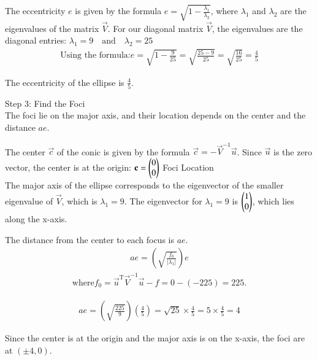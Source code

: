 \documentclass[journal]{IEEEtran}
\begin{document}
The eccentricity $e$ is given by the formula $e = \sqrt{1 - \frac{\lambda_1}{\lambda_2}}$, where $\lambda_1$ and $\lambda_2$ are the eigenvalues of the matrix $\vec{V}$. For our diagonal matrix $\vec{V}$, the eigenvalues are the diagonal entries:
$
\lambda_1 = 9 \quad \text{and} \quad \lambda_2 = 25
$\\
\begin{align}
    \text{Using the formula:}
e = \sqrt{1 - \frac{9}{25}} = \sqrt{\frac{25-9}{25}} = \sqrt{\frac{16}{25}} = \frac{4}{5}
\end{align}


The eccentricity of the ellipse is $\frac{4}{5}$.

Step 3: Find the Foci\\



The foci lie on the major axis, and their location depends on the center and the distance $ae$.



The center $\vec{c}$ of the conic is given by the formula $\vec{c} = -\vec{V}^{-1}\vec{u}$.
Since $\vec{u}$ is the zero vector, the center is at the origin:
$
\mathbf{c} = \begin{pmatrix} 0 \\ 0 \end{pmatrix}
$
Foci Location\\

The major axis of the ellipse corresponds to the eigenvector of the smaller eigenvalue of $\vec{V}$, which is $\lambda_1 = 9$. The eigenvector for $\lambda_1 = 9$ is $\begin{pmatrix} 1 \\ 0 \end{pmatrix}$, which lies along the x-axis.

The distance from the center to each focus is $ae$.\\


\begin{align}
    ae = \left( \sqrt{\frac{f_0}{|\lambda_1|}} \right) e
\end{align}
\begin{align}
    \text{where} f_0 = \vec{u}^{\text{T}}\vec{V}^{-1}\vec{u} - f = 0 - (-225) = 225.
\end{align}

\begin{align}
    ae = \left( \sqrt{\frac{225}{9}} \right) \left( \frac{4}{5} \right) = \sqrt{25} \times \frac{4}{5} = 5 \times \frac{4}{5} = 4
\end{align}


Since the center is at the origin and the major axis is on the x-axis, the foci are at $(\pm 4, 0)$.
\end{document}
